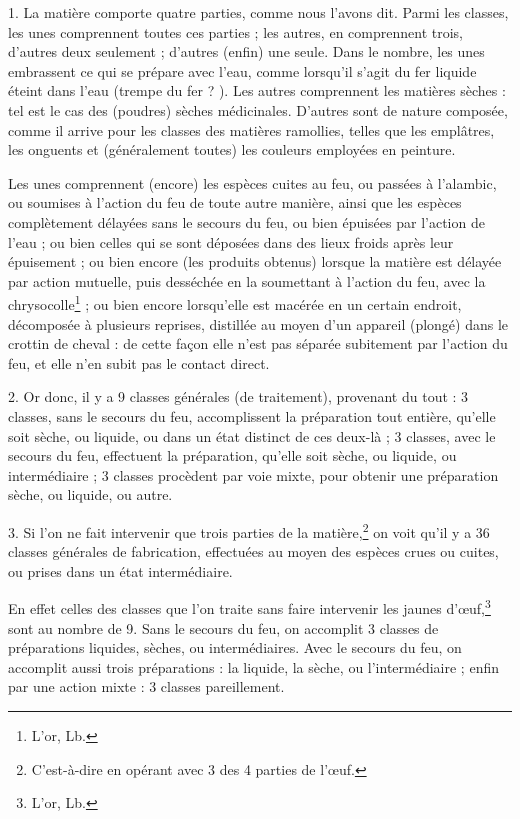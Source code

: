 \documentclass[a4paper, 11pt, oneside, polutonikogreek, french]{article}
\begin{document}
1. La matière comporte quatre parties, comme nous l'avons dit. Parmi les classes, les unes comprennent toutes ces parties ; les autres, en comprennent trois, d'autres deux seulement ; d'autres (enfin) une seule. Dans le nombre, les unes embrassent ce qui se prépare avec l'eau, comme lorsqu'il s'agit du fer liquide éteint dans l'eau (trempe du fer ? ). Les autres comprennent les matières sèches : tel est le cas des (poudres) sèches médicinales. D'autres sont de nature composée, comme il arrive pour les classes des matières ramollies, telles que les emplâtres, les onguents et (généralement toutes) les couleurs employées en peinture.

Les unes comprennent (encore) les espèces cuites au feu, ou passées à l'alambic, ou soumises à l'action du feu de toute autre manière, ainsi que les espèces complètement délayées sans le secours du feu, ou bien épuisées par l'action de l'eau ; ou bien celles qui se sont déposées dans des lieux froids après leur épuisement ; ou bien encore (les produits obtenus) lorsque la matière est délayée par action mutuelle, puis desséchée en la soumettant à l'action du feu, avec la chrysocolle\footnote{L'or, Lb.} ; ou bien encore lorsqu'elle est macérée en un certain endroit, décomposée à plusieurs reprises, distillée au moyen d'un appareil (plongé) dans le crottin de cheval : de cette façon elle n'est pas séparée subitement par l'action du feu, et elle n'en subit pas le contact direct.

2. Or donc, il y a 9 classes générales (de traitement), provenant du tout : 3 classes, sans le secours du feu, accomplissent la préparation tout entière, qu'elle soit sèche, ou liquide, ou dans un état distinct de ces deux-là ; 3 classes, avec le secours du feu, effectuent la préparation, qu'elle soit sèche, ou liquide, ou intermédiaire ; 3 classes procèdent par voie mixte, pour obtenir une préparation sèche, ou liquide, ou autre.

3. Si l'on ne fait intervenir que trois parties de la matière,\footnote{C'est-à-dire en opérant avec 3 des 4 parties de l'œuf.} on voit qu'il y a 36 classes générales de fabrication, effectuées au moyen des espèces crues ou cuites, ou prises dans un état intermédiaire.

En effet celles des classes que l'on traite sans faire intervenir les jaunes d'œuf,\footnote{L'or, Lb.} sont au nombre de 9. Sans le secours du feu, on accomplit 3 classes de préparations liquides, sèches, ou intermédiaires. Avec le secours du feu, on accomplit aussi trois préparations : la liquide, la sèche, ou l'intermédiaire ; enfin par une action mixte : 3 classes pareillement.
\end{document}
